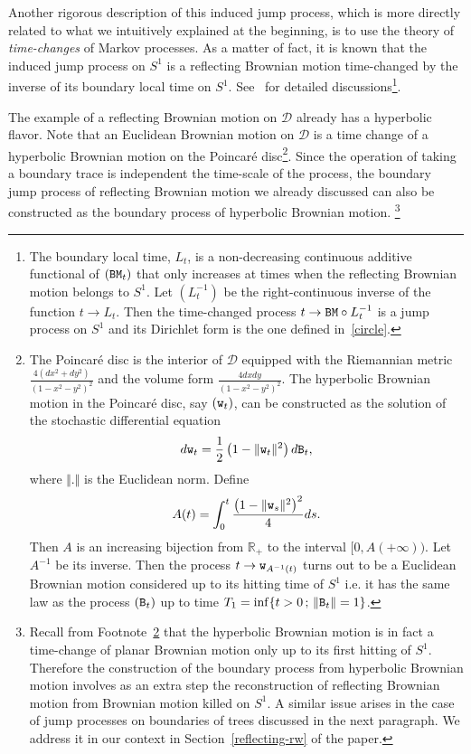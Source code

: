 \documentclass[AHL,Unicode,longabstracts,published]{cedram}
\newcommand{\cd}{\mathcal{D}}
\newcommand{\br}{\mathbb{R}}
\begin{document}
Another rigorous description of this induced jump process, which is more directly related to what we intuitively explained at the beginning, is to use the theory of \emph{time-changes} of Markov processes. As a matter of fact, it is known that the induced jump process on $S^1$ is a reflecting Brownian motion time-changed by the inverse of its boundary local time on $S^1$. See~\cite[Section~5.3, Example~($3^{\circ}$)]{CF} for detailed discussions\footnote { The boundary local time, $L_t$, is a non-decreasing continuous additive functional of $({\tt BM}_t)$ that only increases at times when the reflecting Brownian motion belongs to $S^1$. Let $(L^{-1}_t)$ be the right-continuous inverse of the function $t\to L_t$. Then the time-changed process $t\to {\tt BM}\circ{L^{-1}_t}$ is a jump process on $S^1$ and its Dirichlet form is the one defined in~\eqref{circle}.}.

The example of a reflecting Brownian motion on $\cd$ already has a hyperbolic flavor. Note that an Euclidean Brownian motion on $\cd$ is a time change of a hyperbolic Brownian motion on the Poincaré disc\footnote{\label{foot3}
The Poincaré disc is the interior of $\cd$ equipped with the Riemannian metric $\frac{4(dx^2+dy^2)}{(1-x^2-y^2)^2}$ and the volume form $\frac{4dxdy}{(1-x^2-y^2)^2}$. The hyperbolic Brownian motion in the Poincaré disc, say $({\tt w}_t)$, can be constructed as the solution of the stochastic differential equation
\[
d{\tt w}_t=\frac {1}{2}\left(1-\Vert {\tt w}_t\Vert^2\right) d{\tt B}_t,
\]
where $\Vert.\Vert$ is the Euclidean norm.
Define
\[
A(t)=\int_0^t \frac {\left(1-\Vert{\tt w}_s\Vert^2\right)^2} {4}ds.
\]
Then $A$ is an increasing bijection from $\br_+$ to the interval $[0,A(+\infty))$. Let $A^{-1}$ be its inverse. Then the process $t\to {\tt w}_{A^{-1}(t)}$ turns out to be a Euclidean Brownian motion considered up to its hitting time of $S^1$ i.e. it has the same law as the process $({\tt B}_t)$ up to time $T_1=\inf\{t>0\,;\, \Vert{\tt B}_t\Vert=1\}$.
}. Since the operation of taking a boundary trace is independent the time-scale of the process, the boundary jump process of reflecting Brownian motion we already discussed can also be constructed as the boundary process of hyperbolic Brownian motion. \footnote{
Recall from Footnote~\ref{foot3} that the hyperbolic Brownian motion is in fact a time-change of planar Brownian motion only up to its first hitting of $S^1$. Therefore the construction of the boundary process from hyperbolic Brownian motion involves as an extra step the reconstruction of reflecting Brownian motion from Brownian motion killed on $S^1$. A similar issue arises in the case of jump processes on boundaries of trees discussed in the next paragraph. We address it in our context in Section~\ref{reflecting-rw} of the paper.
}
\end{document}

